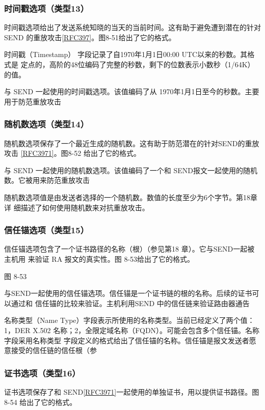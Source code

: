 \subsubsection{时间戳选项（类型13）}
时间戳选项给出了发送系统知晓的当天的当前时间。这有助于避免遭到潜在的针对
SEND 的重放攻击\href{https://www.rfc-editor.org/rfc/rfc397}{[RFC397]}。图8-51给出了它的格式。

时间戳（Timestamp） 字段记录了自1970年1月1日00:00 UTC以来的秒数。其格式是
定点的，高阶的48位编码了完整的秒数，剩下的位数表示小数秒（1/64K）的值。

与 SEND 一起使用的时间戳选项。该值编码了从 1970年1月1日至今的秒数。主要用于防范重放攻击

\subsubsection{随机数选项（类型14）}
随机数选项保存了一个最近生成的随机数。这有助于防范潜在的针对SEND的重放攻击
\href{https://www.rfc-editor.org/rfc/rfc3971}{[RFC3971]}。图8-52 给出了它的格式。

与 SEND 一起使用的随机数选项。该值编码了一个和 SEND报文一起使用的随机数。它被用来防范重放攻击

随机数选项值是由发送者选择的一个随机数。数值的长度至少为6个字节。第18章详
细描述了如何使用随机数来对抗重放攻击。

\subsubsection{信任锚选项（类型15）}
信任锚选项包含了一个证书路径的名称（根）（参见第18 章）。它与SEND一起被主机用
来验证 RA 报文的真实性。图 8-53给出了它的格式。


图 8-53

与SEND一起使用的信任锚选项。信任锚是一个证书链的根的名称。后续的证书可以通过和
信任锚的比较来验证。主机利用SEND 中的信任链来验证路由器通告

名称类型（Name Type）字段表示所使用的名称类型。当前已经定义了两个值：1，DER
X.502 名称；2，全限定域名称（FQDN）。可能会包含多个信任锚。名称字段采用名称类型
字段定义的格式给出了信任锚的名称。信任锚是报文发送者愿意接受的信任链的信任根（参
\subsubsection{证书选项（类型16）}
证书选项保存了和 SEND\href{https://www.rfc-editor.org/rfc/rfc3971}{[RFC3971]}一起使用的单独证书，用以提供证书路径。图8-54
给出了它的格式。

